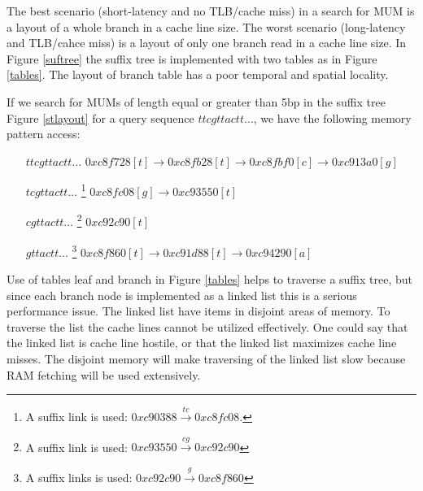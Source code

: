 \documentclass[conference]{IEEEtran}
\begin{document}
The best scenario (short-latency and no TLB/cache miss) in a search for MUM is a layout of a whole branch in a cache line size. The worst scenario (long-latency and TLB/cahce miss) is a layout of only one branch read in a cache line size. In Figure \ref{suftree} the suffix tree is implemented with two tables as in Figure \ref{tables}. The layout of branch table has a poor temporal and spatial locality. 

If we search for MUMs of length equal or greater than 5bp in the suffix tree Figure \ref{stlayout} for a query sequence $ttcgttactt\ldots$, we have the following memory pattern access:
\begin{enumerate}
\item[$ttcgttactt\ldots$] $0xc8f728[t]\rightarrow 0xc8fb28[t]\rightarrow 0xc8fbf0[c]\rightarrow 0xc913a0[g]$
\item[$tcgttactt\ldots$]\footnote{A suffix link is used: $0xc90388\overset{tc}{\rightarrow}0xc8fc08$.} $0xc8fc08[g]\rightarrow 0xc93550[t]$
\item[$cgttactt\ldots$]\footnote{A suffix link is used: $0xc93550\overset{cg}{\rightarrow}0xc92c90$ } $0xc92c90[t]$
\item[$gttactt\ldots$]\footnote{A suffix links is used: $0xc92c90\overset{g}{\rightarrow}0xc8f860$} $0xc8f860[t]\rightarrow 0xc91d88[t]\rightarrow 0xc94290[a]$
\end{enumerate}
Use of tables leaf and branch in Figure \ref{tables} helps to traverse a suffix tree, but since each branch node is implemented as a linked list this is a serious performance issue. The linked list have items in disjoint areas of memory. To traverse the list the cache lines cannot be utilized effectively. One could say that the linked list is cache line hostile, or that the linked list maximizes cache line misses. The disjoint memory will make traversing of the linked list slow because RAM fetching will be used extensively.
\end{document}
